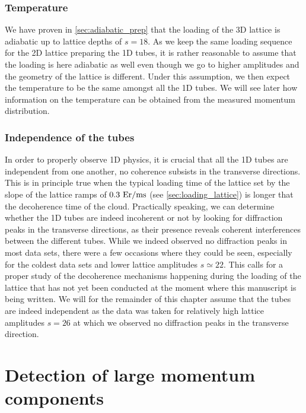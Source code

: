\subsubsection{Temperature}

We have proven in \ref{sec:adiabatic_prep} that the loading of the 3D lattice is adiabatic up to lattice depths of $s=18$. As we keep the same loading sequence for the 2D lattice preparing the 1D tubes, it is rather reasonable to assume that the loading is here adiabatic as well even though we go to higher amplitudes and the geometry of the lattice is different. Under this assumption, we then expect the temperature to be the same amongst all the 1D tubes. We will see later how information on the temperature can be obtained from the measured momentum distribution.

\subsubsection{Independence of the tubes}


In order to properly observe 1D physics, it is crucial that all the 1D tubes are independent from one another, \ie no coherence subsists in the transverse directions. This is in principle true when the typical loading time of the lattice set by the slope of the lattice ramps of $0.3 \ \rm{Er}/\rm{ms}$ (see \ref{sec:loading_lattice}) is longer that the decoherence time of the cloud. Practically speaking, we can determine whether the 1D tubes are indeed incoherent or not by looking for diffraction peaks in the transverse directions, as their presence reveals coherent interferences between the different tubes. While we indeed observed no diffraction peaks in most data sets, there were a few occasions where they could be seen, especially for the coldest data sets and lower lattice amplitudes $s \simeq 22$. This calls for a proper study of the decoherence mechanisms happening during the loading of the lattice that has not yet been conducted at the moment where this manuscript is being written. We will for the remainder of this chapter assume that the tubes are indeed independent as the data was taken for relatively high lattice amplitudes $s=26$ at which we observed no diffraction peaks in the transverse direction.

\section{Detection of large momentum components}

